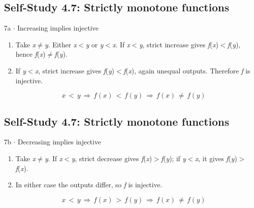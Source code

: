 \documentclass[11pt]{article}
\begin{document}
\begin{keepsection}\subsection{Self-Study 4.7: Strictly monotone functions}

\begin{workedbox}{7a \ensuremath{\cdot} Increasing implies injective}
\begin{enumerate}
\item Take \textit{x}\ensuremath{\neq}\textit{y}. Either \textit{x}\ensuremath{<}\textit{y} or \textit{y}\ensuremath{<}\textit{x}. If \textit{x}\ensuremath{<}\textit{y}, strict increase gives \textit{f}(\textit{x})\ensuremath{<}\textit{f}(\textit{y}), hence \textit{f}(\textit{x})\ensuremath{\neq}\textit{f}(\textit{y}).
\item {}
If \textit{y}\ensuremath{<}\textit{x}, strict increase gives \textit{f}(\textit{y})\ensuremath{<}\textit{f}(\textit{x}), again unequal outputs. Therefore \textit{f} is injective.

\begin{equation*}{x}\, <\, {y}\, \Rightarrow \, {f}({x})\, <\, {f}({y})\, \Rightarrow \, {f}({x})\, ≠\, {f}({y})\end{equation*}
\end{enumerate}
\end{workedbox}

\end{keepsection}
\begin{keepsection}\subsection{Self-Study 4.7: Strictly monotone functions}

\begin{workedbox}{7b \ensuremath{\cdot} Decreasing implies injective}
\begin{enumerate}
\item Take \textit{x}\ensuremath{\neq}\textit{y}. If \textit{x}\ensuremath{<}\textit{y}, strict decrease gives \textit{f}(\textit{x})\ensuremath{>}\textit{f}(\textit{y}); if \textit{y}\ensuremath{<}\textit{x}, it gives \textit{f}(\textit{y})\ensuremath{>}\textit{f}(\textit{x}).
\item {}
In either case the outputs differ, so \textit{f} is injective.

\begin{equation*}{x}\, <\, {y}\, \Rightarrow \, {f}({x})\, >\, {f}({y})\, \Rightarrow \, {f}({x})\, ≠\, {f}({y})\end{equation*}
\end{enumerate}
\end{workedbox}

\end{keepsection}
\end{document}
